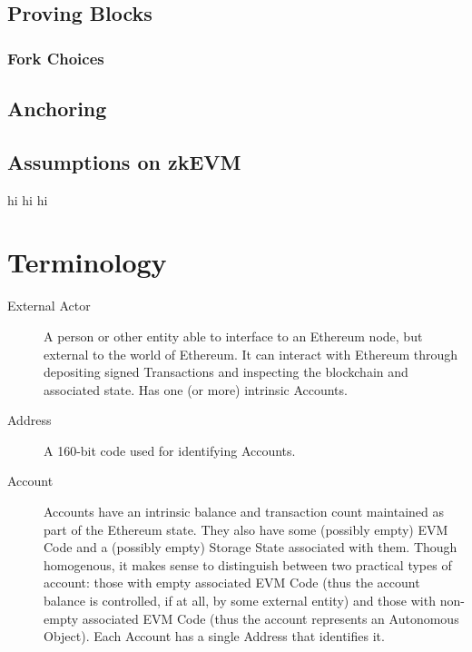 \documentclass[9pt,oneside]{amsart}
\begin{document}
\begin{multicols}{2}
\subsection{Proving Blocks} \label{sec:proving}





\subsubsection{Fork Choices} \label{sec:forkchoices}




\subsection{Anchoring} \label{sec:anchoring}

\subsection{Assumptions on zkEVM}
hi hi hi

\newpage




\end{multicols}


\appendix

\section{Terminology} \label{ch:Terminology}

\begin{description}
\item[External Actor] A person or other entity able to interface to an Ethereum node, but external to the world of Ethereum. It can interact with Ethereum through depositing signed Transactions and inspecting the blockchain and associated state. Has one (or more) intrinsic Accounts.

\item[Address] A 160-bit code used for identifying Accounts.

\item[Account] Accounts have an intrinsic balance and transaction count maintained as part of the Ethereum state. They also have some (possibly empty) EVM Code and a (possibly empty) Storage State associated with them. Though homogenous, it makes sense to distinguish between two practical types of account: those with empty associated EVM Code (thus the account balance is controlled, if at all, by some external entity) and those with non-empty associated EVM Code (thus the account represents an Autonomous Object). Each Account has a single Address that identifies it.

\end{description}
\end{document}
